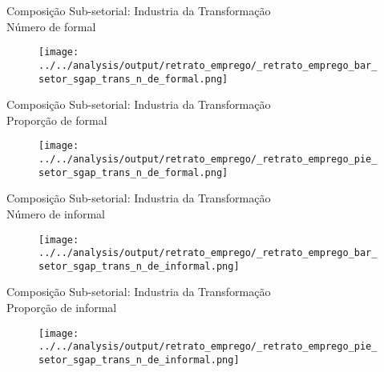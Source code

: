 \begin{frame}[label=_retrato_emprego_bar_setor_sgap_trans_n_de_formal]{{\small Composição Sub-setorial: Industria da Transformação} \\  Número de formal}
\textit{\hyperlink{_retrato_emprego_setor_sgap_trans}{}}
\begin{figure}
  \centering
  \texttt{[image: ../../analysis/output/retrato\_emprego/\_retrato\_emprego\_bar\_setor\_sgap\_trans\_n\_de\_formal.png]}
  \caption{}
  \label{fig:_retrato_emprego_bar_setor_sgap_trans_n_de_formal}
\end{figure}
\end{frame}



\begin{frame}[label=_retrato_emprego_pie_setor_sgap_trans_n_de_formal]{{\small Composição Sub-setorial: Industria da Transformação} \\  Proporção de formal}
\textit{\hyperlink{_retrato_emprego_setor_sgap_trans}{}}
\begin{figure}
  \centering
  \texttt{[image: ../../analysis/output/retrato\_emprego/\_retrato\_emprego\_pie\_setor\_sgap\_trans\_n\_de\_formal.png]}
  \caption{}
  \label{fig:_retrato_emprego_pie_setor_sgap_trans_n_de_formal}
\end{figure}
\end{frame}


\begin{frame}[label=_retrato_emprego_bar_setor_sgap_trans_n_de_informal]{{\small Composição Sub-setorial: Industria da Transformação} \\  Número de informal}
\textit{\hyperlink{_retrato_emprego_setor_sgap_trans}{}}
\begin{figure}
  \centering
  \texttt{[image: ../../analysis/output/retrato\_emprego/\_retrato\_emprego\_bar\_setor\_sgap\_trans\_n\_de\_informal.png]}
  \caption{}
  \label{fig:_retrato_emprego_bar_setor_sgap_trans_n_de_informal}
\end{figure}
\end{frame}


\begin{frame}[label=_retrato_emprego_pie_setor_sgap_trans_n_de_informal]{{\small Composição Sub-setorial: Industria da Transformação} \\  Proporção de informal}
\textit{\hyperlink{_retrato_emprego_setor_sgap_trans}{}}
\begin{figure}
  \centering
  \texttt{[image: ../../analysis/output/retrato\_emprego/\_retrato\_emprego\_pie\_setor\_sgap\_trans\_n\_de\_informal.png]}
  \caption{}
  \label{fig:_retrato_emprego_pie_setor_sgap_trans_n_de_informal}
\end{figure}
\end{frame}

